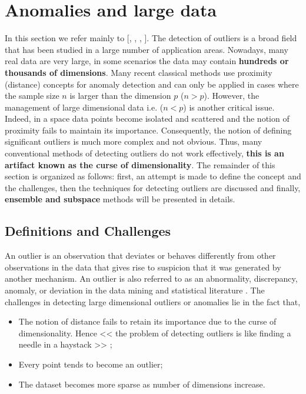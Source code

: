
\section{Anomalies and large data }\label{Section:4}
%
In this section we refer mainly to [\cite{A1}, \cite{A8}, \cite{A10}, \cite{A14}  \cite{Aurore}].\newl 
The detection of outliers is a broad field that has been studied in a large number of application areas. Nowadays, many real data are very large, in some scenarios the data may contain \textbf{hundreds or thousands of dimensions}. Many recent classical methods use proximity (distance) concepts for anomaly detection and can only be applied in cases where the sample size $n$ is larger than the dimension $p$ ($n>p$). However, the management of large dimensional data i.e. ($n<p$) is another  critical issue. Indeed, in a space data points become isolated and scattered and the notion of proximity fails to maintain its importance. Consequently, the notion of defining significant outliers is much more complex and not obvious.  Thus, many conventional methods of detecting outliers do not work effectively, \textbf{this is an artifact known as the curse of dimensionality}.\newl
The remainder of this section is organized as follows: first, an attempt is made to define the concept and the challenges, then the techniques for detecting outliers are discussed and finally, \textbf{ensemble and subspace} methods will be presented in details. 
%
%
\subsection{Definitions and Challenges}
%
%
An outlier is an observation that deviates or behaves differently from other observations in the data that gives rise to suspicion that it was generated by another mechanism. An outlier is also referred to as an abnormality, discrepancy, anomaly, or deviation in the data mining and statistical literature \cite{A1}.
The challenges in detecting large dimensional outliers or anomalies lie in the fact that,
\begin{itemize}
\item The notion of distance fails to retain its importance due to the curse of dimensionality. Hence << the problem of detecting outliers is like finding a needle in a haystack >> \cite{A14};
\item Every point tends to become an outlier;
\item The dataset becomes more sparse as number of dimensions increase.
\end{itemize}

